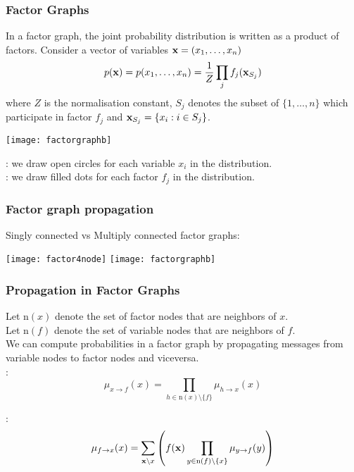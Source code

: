 \begin{frame}
\frametitle{Factor Graphs}

In a factor graph, the joint probability distribution  is written as a
product of factors. Consider a vector of variables $\mathbf x=(x_1,\ldots,x_n)$
\[
p(\mathbf x)=p(x_1,\ldots,x_n) = \frac{1}{Z} \prod_{j} f_j(\mathbf x_{S_j})
\]
where $Z$ is the normalisation constant, $S_j$ denotes the subset of
$\{1,\ldots,n\}$ which participate in factor  $f_j$ and $\mathbf x_{S_j} =
\{ x_i : i \in S_j \}$.\\[2ex]

\centerline{\texttt{[image: factorgraphb]}}

: we draw open circles for each variable $x_i$ in the
distribution.\\[1ex]
: we draw filled dots for each factor $f_j$ in
the distribution.
\end{frame}
\begin{frame}
\frametitle{Factor graph propagation}

\centerline{Singly connected vs Multiply connected factor graphs:}

  \vspace{2em} 

\centerline{\texttt{[image: factor4node]}
  \hspace{2em} 
\texttt{[image: factorgraphb]}}

\end{frame}
\begin{frame}
\frametitle{Propagation in Factor Graphs}

Let ${\mathrm n}(x)$ denote the set of factor nodes that are neighbors of
$x$.\\
Let ${\mathrm n}(f)$ denote the set of variable nodes that are
neighbors of $f$.  \\[2ex]

We can compute probabilities in a factor graph by propagating messages
from variable nodes to factor nodes and viceversa. \\[2ex]

:
\[
\mu_{x\rightarrow f}(x) = \prod_{h \in {\mathrm n}(x)\setminus\{f\}}
\mu_{h\rightarrow x} (x)
\]

:
\[
\mu_{f \rightarrow x}(x) = \sum_{\mathbf x\setminus x} \left( f(\mathbf x)
  \prod_{y\in {\mathrm n}(f)\setminus \{x\}} \mu_{y\rightarrow f}(y)
\right)
\]

\end{frame}
